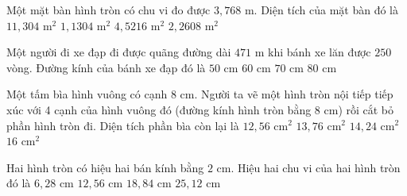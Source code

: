 \begin{ex} %
Một mặt bàn hình tròn có chu vi đo được $3{,}768\text{ m}$. Diện tích của mặt bàn đó là
\choice
{$11{,}304\text{ m}^2$}
{\True $1{,}1304\text{ m}^2$}
{$4{,}5216\text{ m}^2$}
{$2{,}2608\text{ m}^2$}
\end{ex}

\begin{ex} %
Một người đi xe đạp đi được quãng đường dài $471\text{ m}$ khi bánh xe lăn được $250$ vòng. Đường kính của bánh xe đạp đó là
\choice
{$50\text{ cm}$}
{\True $60\text{ cm}$}
{$70\text{ cm}$}
{$80\text{ cm}$}
\end{ex}

\begin{ex} %
Một tấm bìa hình vuông có cạnh $8\text{ cm}$. Người ta vẽ một hình tròn nội tiếp tiếp xúc với 4 cạnh của hình vuông đó (đường kính hình tròn bằng $8\text{ cm}$) rồi cắt bỏ phần hình tròn đi. Diện tích phần bìa còn lại là
\choice
{$12{,}56\text{ cm}^2$}
{\True $13{,}76\text{ cm}^2$}
{$14{,}24\text{ cm}^2$}
{$16\text{ cm}^2$}
\end{ex}

\begin{ex} %
Hai hình tròn có hiệu hai bán kính bằng $2\text{ cm}$. Hiệu hai chu vi của hai hình tròn đó là
\choice
{$6{,}28\text{ cm}$}
{\True $12{,}56\text{ cm}$}
{$18{,}84\text{ cm}$}
{$25{,}12\text{ cm}$}
\end{ex}

